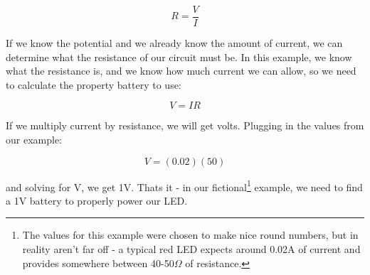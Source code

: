 \begin{equation}
R = \frac{V}{I}
\end{equation}

If we know the potential and we already know the amount of current, we can determine what the resistance of our circuit must be. In this example, we know what the resistance is, and we know how much current we can allow, so we need to calculate the property battery to use:

\begin{equation}
V = IR
\end{equation}

If we multiply current by resistance, we will get volts. Plugging in the values from our example:

\begin{equation}
V = (0.02)(50)
\end{equation}

and solving for V, we get 1V. Thats it - in our fictional\footnote{The values for this example were chosen to make nice round numbers, but in reality aren't far off - a typical red LED expects around 0.02A of current and provides somewhere between 40-50$\Omega$ of resistance.} example, we need to find a 1V battery to properly power our LED.
